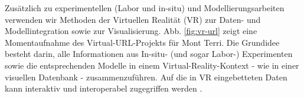 
Zusätzlich zu experimentellen (Labor und in-situ) und Modellierungsarbeiten verwenden wir Methoden der Virtuellen Realität (VR) zur Daten- und Modellintegration sowie zur Visualisierung. Abb. \ref{fig:vr-url} zeigt eine Momentaufnahme des Virtual-URL-Projekts für Mont Terri. Die Grundidee besteht darin, alle Informationen aus In-situ- (und sogar Labor-) Experimenten sowie die entsprechenden Modelle in einem Virtual-Reality-Kontext - wie in einer visuellen Datenbank - zusammenzuführen. Auf die in VR eingebetteten Daten kann interaktiv und interoperabel zugegriffen werden \cite{Rink2020}.